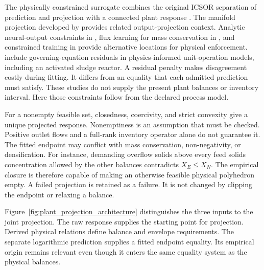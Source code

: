 The physically constrained surrogate combines the original ICSOR separation of prediction and projection with a connected plant response \citep{Selerio2026}. The manifold projection developed by \citet{Valente2025} provides related output-projection context. Analytic neural-output constraints in \citet{Beucler2021}, flux learning for mass conservation in \citet{SturmWexler2020}, and constrained training in \citet{Ruckstuhl2021} provide alternative locations for physical enforcement. \citet{Li2024} include governing-equation residuals in physics-informed unit-operation models, including an activated sludge reactor. A residual penalty makes disagreement costly during fitting. It differs from an equality that each admitted prediction must satisfy. These studies do not supply the present plant balances or inventory interval. Here those constraints follow from the declared process model.

For a nonempty feasible set, closedness, coercivity, and strict convexity give a unique projected response. Nonemptiness is an assumption that must be checked. Positive outlet flows and a full-rank inventory operator alone do not guarantee it. The fitted endpoint may conflict with mass conservation, non-negativity, or densification. For instance, demanding overflow solids above every feed solids concentration allowed by the other balances contradicts $X_E\le X_N$. The empirical closure is therefore capable of making an otherwise feasible physical polyhedron empty. A failed projection is retained as a failure. It is not changed by clipping the endpoint or relaxing a balance.

Figure~\ref{fig:plant_projection_architecture} distinguishes the three inputs to the joint projection. The raw response supplies the starting point for projection. Derived physical relations define balance and envelope requirements. The separate logarithmic prediction supplies a fitted endpoint equality. Its empirical origin remains relevant even though it enters the same equality system as the physical balances.

